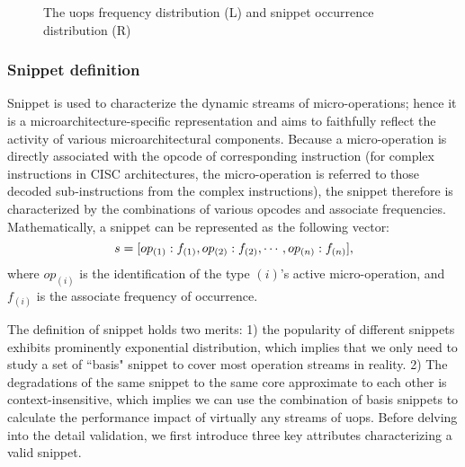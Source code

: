 \begin{figure*}[t]
\centering
{}
\caption{The uops frequency distribution (L)  and snippet occurrence  distribution (R)}
\label{hotdist}
\end{figure*}

\subsubsection{Snippet definition}
Snippet is used to characterize the dynamic streams of micro-operations; hence it is a microarchitecture-specific representation and aims to faithfully reflect the activity of various microarchitectural components.  Because a micro-operation is directly associated with the opcode of corresponding instruction (for complex instructions in CISC architectures, the micro-operation is referred to those decoded sub-instructions from the complex instructions), the snippet therefore is characterized by the combinations of various opcodes and associate frequencies.  Mathematically,  a snippet can be represented as the following vector:
\begin{equation}
 s=[op_{(1)}: f_{{(1)}}, op_{(2)}:f_{{(2)}}, \cdots, \\op_{(n)}:f_{{(n)}}],
\end{equation}
where  $op_{(i)}$ is the identification of the type $(i)$'s active micro-operation, and $f_{{(i)}}$ is the associate  frequency of occurrence.  


The definition of snippet holds two merits: 1) the popularity of different snippets exhibits prominently exponential distribution, which implies that we only need to study a set of ``basis" snippet to cover most operation streams in reality. 2) The degradations of the same snippet to the same core approximate to each other is context-insensitive,  which implies we can use the combination of basis snippets to calculate the performance impact of virtually any streams of uops.  Before delving into the detail validation, we first introduce three key attributes characterizing a valid snippet.

